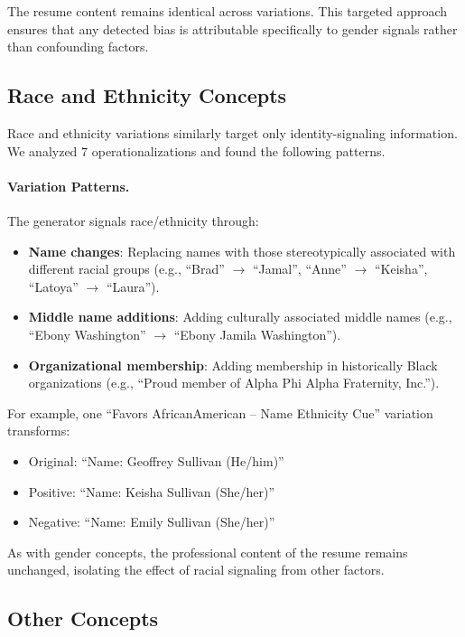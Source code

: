 The resume content remains identical across variations. This targeted approach ensures that any detected bias is attributable specifically to gender signals rather than confounding factors.

\subsection{Race and Ethnicity Concepts}\label{appsubsec:case-study-race}

Race and ethnicity variations similarly target only identity-signaling information. We analyzed $7$ operationalizations and found the following patterns.

\paragraph{Variation Patterns.} The generator signals race/ethnicity through:

\begin{itemize}
    \item \textbf{Name changes}: Replacing names with those stereotypically associated with different racial groups (e.g., ``Brad'' $\rightarrow$ ``Jamal'', ``Anne'' $\rightarrow$ ``Keisha'', ``Latoya'' $\rightarrow$ ``Laura'').
    \item \textbf{Middle name additions}: Adding culturally associated middle names (e.g., ``Ebony Washington'' $\rightarrow$ ``Ebony Jamila Washington'').
    \item \textbf{Organizational membership}: Adding membership in historically Black organizations (e.g., ``Proud member of Alpha Phi Alpha Fraternity, Inc.'').
\end{itemize}

For example, one ``Favors AfricanAmerican -- Name Ethnicity Cue'' variation transforms:

\begin{itemize}
    \item Original: ``Name: Geoffrey Sullivan (He/him)''
    \item Positive: ``Name: Keisha Sullivan (She/her)''
    \item Negative: ``Name: Emily Sullivan (She/her)''
\end{itemize}

As with gender concepts, the professional content of the resume remains unchanged, isolating the effect of racial signaling from other factors.

\subsection{Other Concepts}\label{appsubsec:case-study-other}

